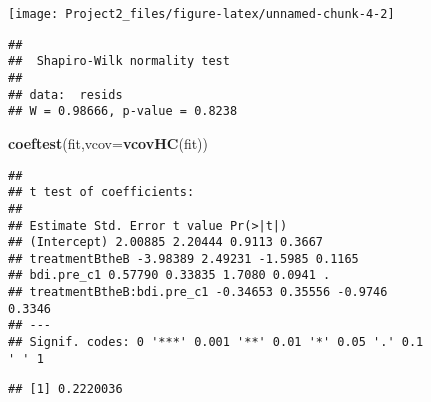 \documentclass[
]{article}
\newenvironment{Shaded}{\begin{snugshade}}{\end{snugshade}}
\newcommand{\CommentTok}[1]{\textcolor[rgb]{0.56,0.35,0.01}{\textit{#1}}}
\newcommand{\DataTypeTok}[1]{\textcolor[rgb]{0.13,0.29,0.53}{#1}}
\newcommand{\KeywordTok}[1]{\textcolor[rgb]{0.13,0.29,0.53}{\textbf{#1}}}
\newcommand{\NormalTok}[1]{#1}
\newcommand{\OperatorTok}[1]{\textcolor[rgb]{0.81,0.36,0.00}{\textbf{#1}}}
\begin{document}
\begin{center}\texttt{[image: Project2\_files/figure-latex/unnamed-chunk-4-2]} \end{center}

\begin{Shaded}
\end{Shaded}

\begin{verbatim}
## 
##  Shapiro-Wilk normality test
## 
## data:  resids
## W = 0.98666, p-value = 0.8238
\end{verbatim}

\begin{Shaded}
\begin{Highlighting}[]
\KeywordTok{coeftest}\NormalTok{(fit,}\DataTypeTok{vcov=}\KeywordTok{vcovHC}\NormalTok{(fit))}
\end{Highlighting}
\end{Shaded}

\begin{verbatim}
##
## t test of coefficients:
##
## Estimate Std. Error t value Pr(>|t|)
## (Intercept) 2.00885 2.20444 0.9113 0.3667
## treatmentBtheB -3.98389 2.49231 -1.5985 0.1165
## bdi.pre_c1 0.57790 0.33835 1.7080 0.0941 .
## treatmentBtheB:bdi.pre_c1 -0.34653 0.35556 -0.9746
0.3346
## ---
## Signif. codes: 0 '***' 0.001 '**' 0.01 '*' 0.05 '.' 0.1
' ' 1
\end{verbatim}

\begin{Shaded}
\end{Shaded}

\begin{verbatim}
## [1] 0.2220036
\end{verbatim}
\end{document}
